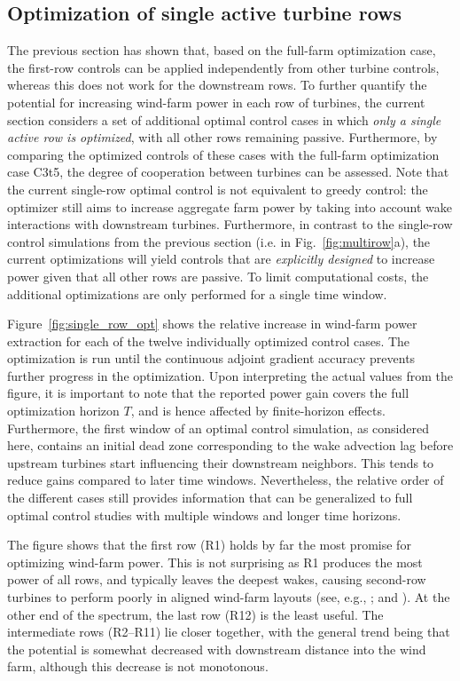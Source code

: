 \documentclass[wes, manuscript]{copernicus}
\begin{document}
\subsection{Optimization of single active turbine rows}\label{sec:optimization_single}
The previous section has shown that, based on the full-farm optimization case, the first-row controls can be applied independently from other turbine controls, whereas this does not work for the downstream rows. To further quantify the potential for increasing wind-farm power in each row of turbines, the current section considers a set of additional optimal control cases in which \emph{only a single active row is optimized}, with all other rows remaining passive. Furthermore, by comparing the optimized controls of these cases with the full-farm optimization case C3t5, the degree of cooperation between turbines can be assessed. Note that the current single-row optimal control is not equivalent to greedy control: the optimizer still aims to increase aggregate farm power by taking into account wake interactions with downstream turbines. Furthermore, in contrast to the single-row control simulations from the previous section (i.e. in Fig.~\ref{fig:multirow}a), the current optimizations will yield controls that are \emph{explicitly designed} to increase power given that all other rows are passive. To limit computational costs, the additional optimizations are only performed for a single time window. 

Figure~\ref{fig:single_row_opt} shows the relative increase in wind-farm power extraction for each of the twelve individually optimized control cases. The optimization is run until the continuous adjoint gradient accuracy prevents further progress in the optimization. Upon interpreting the actual values from the figure, it is important to note that the reported power gain covers the full optimization horizon $T$, and is hence affected by finite-horizon effects. Furthermore, the first window of an optimal control simulation, as considered here, contains an initial dead zone corresponding to the wake advection lag before upstream turbines start influencing their downstream neighbors. This tends to reduce gains compared to later time windows. Nevertheless, the relative order of the different cases still provides information that can be generalized to full optimal control studies with multiple windows and longer time horizons. 

The figure shows that the first row (R1) holds by far the most promise for optimizing wind-farm power. This is not surprising as R1 produces the most power of all rows, and typically leaves the deepest wakes, causing second-row turbines to perform  poorly in aligned wind-farm layouts (see, e.g., \citealp{porte2013numerical,nilsson2015large}; and \citealp{stevens2016effects}). At the other end of the spectrum, the last row (R12) is the least useful. The intermediate rows (R2--R11) lie closer together, with the general trend being that the potential is somewhat decreased with downstream distance into the wind farm, although this decrease is not monotonous. 
\end{document}
